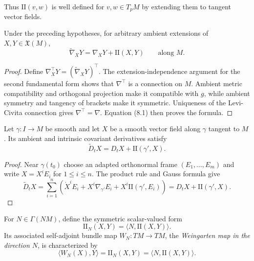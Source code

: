 Thus $\mathrm{II}(v,w)$ is well defined for $v,w\in T_pM$ by extending them
to tangent vector fields.

\begin{theorem}
\label{thm:gauss-formula}

Under the preceding hypotheses, for arbitrary ambient extensions of
$X,Y\in\mathfrak X(M)$,
\[
\widetilde\nabla_XY=\nabla_XY+\mathrm{II}(X,Y)
\qquad\text{along }M.
\]
\end{theorem}

\begin{proof}
\sketch Define
$\nabla_X^\top Y=(\widetilde\nabla_XY)^\top$. The extension-independence
argument for the second fundamental form shows that $\nabla^\top$ is a
connection on $M$. Ambient metric compatibility and orthogonal projection
make it compatible with $g$, while ambient symmetry and tangency of brackets
make it symmetric. Uniqueness of the Levi-Civita connection gives
$\nabla^\top=\nabla$. Equation (8.1) then proves the formula.
\end{proof}

\begin{corollary}
\label{cor:gauss-formula-along-curve}

Let $\gamma:I\to M$ be smooth and let $X$ be a smooth vector field along
$\gamma$ tangent to $M$. Its ambient and intrinsic covariant derivatives
satisfy
\begin{equation}
\widetilde D_tX=D_tX+\mathrm{II}(\gamma',X).
\tag{8.2}
\end{equation}
\end{corollary}

\begin{proof}
\sketch Near $\gamma(t_0)$ choose an adapted orthonormal frame
$(E_1,\ldots,E_m)$ and write $X=X^iE_i$ for $1\leq i\leq n$. The product rule
and Gauss formula give
\[
\widetilde D_tX
=\sum_{i=1}^n\left(\dot X^iE_i+X^i\nabla_{\gamma'}E_i
+X^i\mathrm{II}(\gamma',E_i)\right)
=D_tX+\mathrm{II}(\gamma',X).
\]
\end{proof}

For $N\in\Gamma(NM)$, define the symmetric scalar-valued form
\begin{equation}
\mathrm{II}_N(X,Y)=\langle N,\mathrm{II}(X,Y)\rangle.
\tag{8.3}
\end{equation}
Its associated self-adjoint bundle map $W_N:TM\to TM$, the
\emph{Weingarten map in the direction $N$}, is characterized by
\begin{equation}
\langle W_N(X),Y\rangle
=\mathrm{II}_N(X,Y)
=\langle N,\mathrm{II}(X,Y)\rangle.
\tag{8.4}
\end{equation}

